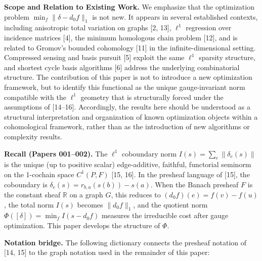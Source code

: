 \documentclass[
]{article}
\begin{document}
\textbf{Scope and Relation to Existing Work.} We emphasize that the
optimization problem \(\min_f \|\delta - d_0 f\|_1\) is not new. It
appears in several established contexts, including anisotropic total
variation on graphs {[}2, 13{]}, \(\ell^1\) regression over incidence
matrices {[}4{]}, the minimum homologous chain problem {[}12{]}, and is
related to Gromov's bounded cohomology {[}11{]} in the
infinite-dimensional setting. Compressed sensing and basis pursuit
{[}5{]} exploit the same \(\ell^1\) sparsity structure, and shortest
cycle basis algorithms {[}6{]} address the underlying combinatorial
structure. The contribution of this paper is not to introduce a new
optimization framework, but to identify this functional as the unique
gauge-invariant norm compatible with the \(\ell^1\) geometry that is
structurally forced under the assumptions of {[}14--16{]}. Accordingly,
the results here should be understood as a structural interpretation and
organization of known optimization objects within a cohomological
framework, rather than as the introduction of new algorithms or
complexity results.

\textbf{Recall (Papers 001--002).} The \(\ell^1\) coboundary norm
\(I(s) = \sum_e \|\delta_e(s)\|\) is the unique (up to positive scalar)
edge-additive, faithful, functorial seminorm on the 1-cochain space
\(C^1(P, F)\) {[}15, 16{]}. In the presheaf language of {[}15{]}, the
coboundary is \(\delta_e(s) = r_{b,a}(s(b)) - s(a)\). When the Banach
presheaf \(F\) is the constant sheaf \(\mathbb{R}\) on a graph \(G\),
this reduces to \((d_0 f)(e) = f(v) - f(u)\), the total norm \(I(s)\)
becomes \(\|d_0 f\|_1\), and the quotient norm
\(\Phi([\delta]) = \min_f I(s - d_0 f)\) measures the irreducible cost
after gauge optimization. This paper develops the structure of \(\Phi\).

\textbf{Notation bridge.} The following dictionary connects the presheaf
notation of {[}14, 15{]} to the graph notation used in the remainder of
this paper:
\end{document}
